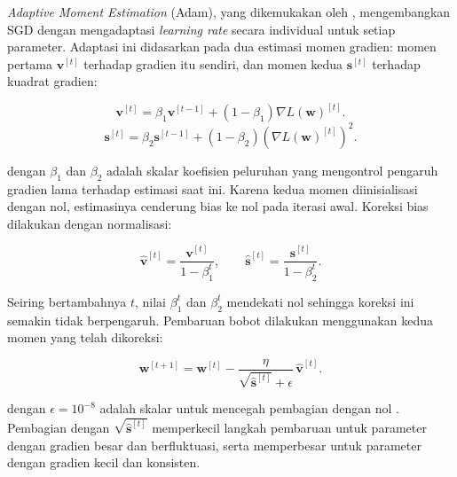 \textit{Adaptive Moment Estimation} (Adam), yang dikemukakan oleh
\parencite{kingma2017}, mengembangkan SGD dengan mengadaptasi
\textit{learning rate} secara individual untuk setiap parameter. Adaptasi
ini didasarkan pada dua estimasi momen gradien: momen pertama
$\mathbf{v}^{[t]}$ terhadap gradien itu sendiri, dan momen kedua
$\mathbf{s}^{[t]}$ terhadap kuadrat gradien:

\vspace{-1em}
\setlength{\abovedisplayskip}{0pt}
\begin{equation}
    \mathbf{v}^{[t]} = \beta_1 \mathbf{v}^{[t-1]}
    + (1 - \beta_1) \nabla L(\mathbf{w})^{[t]}.
    \label{eq:adam_first_moment}
\end{equation}
\begin{equation}
    \mathbf{s}^{[t]} = \beta_2 \mathbf{s}^{[t-1]}
    + (1 - \beta_2) \left(\nabla L(\mathbf{w})^{[t]}\right)^2.
    \label{eq:adam_second_moment}
\end{equation}

\noindent dengan $\beta_1$ dan $\beta_2$ adalah skalar koefisien peluruhan yang
mengontrol pengaruh gradien lama terhadap estimasi saat ini. Karena kedua
momen diinisialisasi dengan nol, estimasinya cenderung bias ke nol pada
iterasi awal. Koreksi bias dilakukan dengan normalisasi:

\vspace{-1em}
\setlength{\abovedisplayskip}{0pt}
\begin{equation}
    \hat{\mathbf{v}}^{[t]} = \frac{\mathbf{v}^{[t]}}{1 - \beta_1^t},
    \qquad
    \hat{\mathbf{s}}^{[t]} = \frac{\mathbf{s}^{[t]}}{1 - \beta_2^t}.
    \label{eq:adam_bias_correction}
\end{equation}

Seiring bertambahnya $t$, nilai $\beta_1^t$ dan $\beta_2^t$ mendekati nol
sehingga koreksi ini semakin tidak berpengaruh. Pembaruan bobot dilakukan
menggunakan kedua momen yang telah dikoreksi:

\vspace{-1em}
\setlength{\abovedisplayskip}{0pt}
\begin{equation}
    \mathbf{w}^{[t+1]} = \mathbf{w}^{[t]}
    - \frac{\eta}{\sqrt{\hat{\mathbf{s}}^{[t]}} + \epsilon}\,
    \hat{\mathbf{v}}^{[t]}.
    \label{eq:adam_update}
\end{equation}

\noindent dengan $\epsilon = 10^{-8}$ adalah skalar untuk mencegah pembagian
dengan nol \parencite{zhang2023}. Pembagian dengan
$\sqrt{\hat{\mathbf{s}}^{[t]}}$ memperkecil langkah pembaruan untuk
parameter dengan gradien besar dan berfluktuasi, serta memperbesar untuk
parameter dengan gradien kecil dan konsisten.


